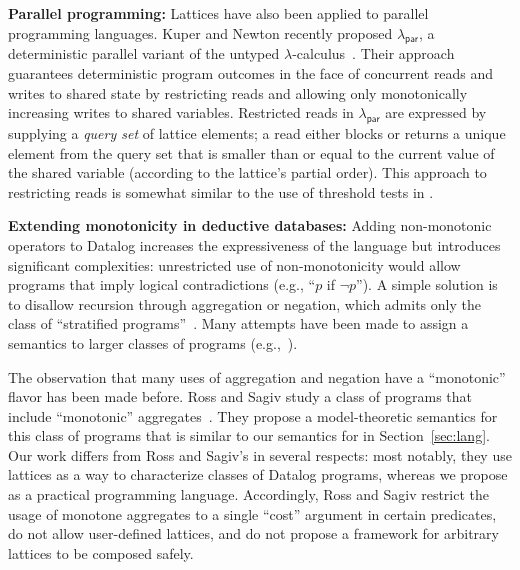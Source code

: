 \vspace{0.5em}\noindent
\textbf{Parallel programming:} Lattices have also been applied to parallel
programming languages. Kuper and Newton recently proposed
$\lambda_{\textsf{par}}$, a deterministic parallel variant of the untyped
$\lambda$-calculus~\cite{Kuper2012}. Their approach guarantees deterministic
program outcomes in the face of concurrent reads and writes to shared state by
restricting reads and allowing only monotonically increasing writes to shared
variables.  Restricted reads in $\lambda_{\textsf{par}}$ are expressed by
supplying a \emph{query set} of lattice elements; a read either blocks or
returns a unique element from the query set that is smaller than or equal to the
current value of the shared variable (according to the lattice's partial
order). This approach to restricting reads is somewhat similar to the use of
threshold tests in \lang.

\vspace{0.5em}\noindent
\textbf{Extending monotonicity in deductive databases:} Adding non-monotonic
operators to Datalog increases the expressiveness of the language but introduces
significant complexities: unrestricted use of non-monotonicity would allow
programs that imply logical contradictions (e.g., ``$p$ if $\lnot p$''). A
simple solution is to disallow recursion through aggregation or negation, which
admits only the class of ``stratified programs''~\cite{Apt1988}. Many attempts
have been made to assign a semantics to larger classes of programs
(e.g.,~\cite{Gelfond1988,Ross1990,VanGelder1991}).

The observation that many uses of aggregation and negation have a ``monotonic''
flavor has been made before. Ross and Sagiv study a class of programs that
include ``monotonic'' aggregates~\cite{Ross1992}. They propose a model-theoretic
semantics for this class of programs that is similar to our semantics for \lang
in Section~\ref{sec:lang}. Our work differs from Ross and Sagiv's in several
respects: most notably, they use lattices as a way to characterize classes of
Datalog programs, whereas we propose \lang as a practical programming
language. Accordingly, Ross and Sagiv restrict the usage of monotone aggregates
to a single ``cost'' argument in certain predicates, do not allow user-defined
lattices, and do not propose a framework for arbitrary lattices to be composed
safely.

